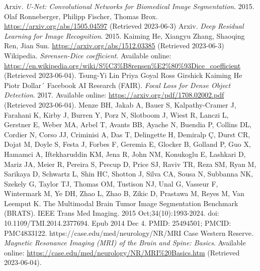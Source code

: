 \documentclass[fleqn,10pt]{SelfArx} %
\begin{document}

\begin{thebibliography}{2}
    
    Arxiv. \emph{U-Net: Convolutional Networks for Biomedical Image Segmentation}. 2015.
    Olaf Ronneberger, Philipp Fischer, Thomas Brox.
    \url{https://arxiv.org/abs/1505.04597} (Retrieved 2023-06-3)
    Arxiv. \emph{Deep Residual Learning for Image Recognition}. 2015.
    Kaiming He, Xiangyu Zhang, Shaoqing Ren, Jian Sun.
    \url{https://arxiv.org/abs/1512.03385} (Retrieved 2023-06-3)
    Wikipedia. \emph{Sørensen-Dice coefficient}. Available online: \url{https://en.wikipedia.org/wiki/S\%C3\%B8rensen\%E2\%80\%93Dice_coefficient} (Retrieved 2023-06-04).
    Tsung-Yi Lin Priya Goyal Ross Girshick Kaiming He Piotr Dollar´
    Facebook AI Research (FAIR). \emph{Focal Loss for Dense Object Detection}. 2017. Available online: \url{https://arxiv.org/pdf/1708.02002.pdf} (Retrieved 2023-06-04).
    Menze BH, Jakab A, Bauer S, Kalpathy-Cramer J, Farahani K, Kirby J, Burren Y, Porz N, Slotboom J, Wiest R, Lanczi L, Gerstner E, Weber MA, Arbel T, Avants BB, Ayache N, Buendia P, Collins DL, Cordier N, Corso JJ, Criminisi A, Das T, Delingette H, Demiralp Ç, Durst CR, Dojat M, Doyle S, Festa J, Forbes F, Geremia E, Glocker B, Golland P, Guo X, Hamamci A, Iftekharuddin KM, Jena R, John NM, Konukoglu E, Lashkari D, Mariz JA, Meier R, Pereira S, Precup D, Price SJ, Raviv TR, Reza SM, Ryan M, Sarikaya D, Schwartz L, Shin HC, Shotton J, Silva CA, Sousa N, Subbanna NK, Szekely G, Taylor TJ, Thomas OM, Tustison NJ, Unal G, Vasseur F, Wintermark M, Ye DH, Zhao L, Zhao B, Zikic D, Prastawa M, Reyes M, Van Leemput K. The Multimodal Brain Tumor Image Segmentation Benchmark (BRATS). IEEE Trans Med Imaging. 2015 Oct;34(10):1993-2024. doi: 10.1109/TMI.2014.2377694. Epub 2014 Dec 4. PMID: 25494501; PMCID: PMC4833122.
https://case.edu/med/neurology/NR/MRI%
    Case Western Reserve. \emph{Magnetic Resonance Imaging (MRI) of the Brain and Spine: Basics}. Available online: \url{https://case.edu/med/neurology/NR/MRI\%20Basics.htm} (Retrieved 2023-06-04).
\end{thebibliography}
\end{document}

